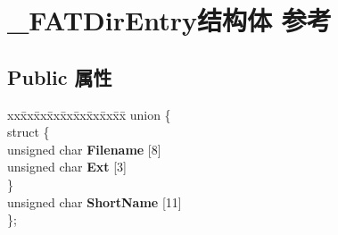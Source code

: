 \hypertarget{struct___f_a_t_dir_entry}{}\section{\+\_\+\+F\+A\+T\+Dir\+Entry结构体 参考}
\label{struct___f_a_t_dir_entry}
\subsection*{Public 属性}
\begin{DoxyCompactItemize}
\item 
\mbox{\label{struct___f_a_t_dir_entry_a5ddd8442df505f1532f27cc94f48d072}} 
\begin{tabbing}
xx\=xx\=xx\=xx\=xx\=xx\=xx\=xx\=xx\=\kill
union \{\\
\mbox{\label{union___f_a_t_dir_entry_1_1_0D628_a94b9e24bc6d48f5ba22480b6b9dc54ca}} 
\>struct \{\\
\>\>unsigned char {\bfseries Filename} \mbox{[}8\mbox{]}\\
\>\>unsigned char {\bfseries Ext} \mbox{[}3\mbox{]}\\
\>\} \\
\>unsigned char {\bfseries ShortName} \mbox{[}11\mbox{]}\\
\}; \\


\end{tabbing}
\end{DoxyCompactItemize}
